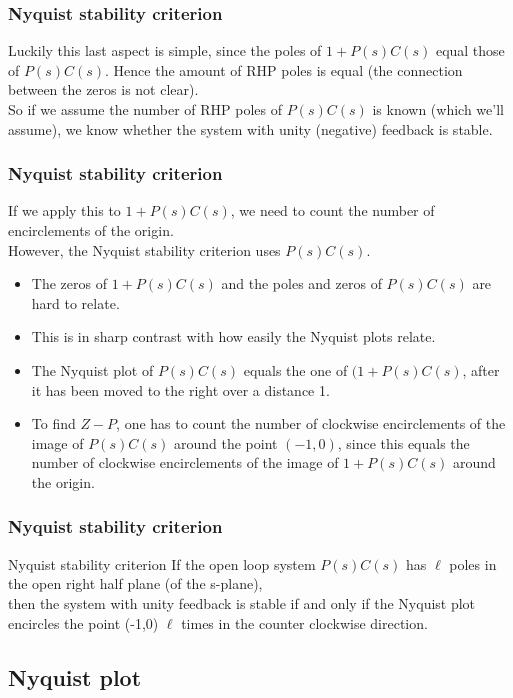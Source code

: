 \begin{frame}
	\frametitle{Nyquist stability criterion}
	\vspace{-10ex}
	Luckily this last aspect is simple, since the poles of $1+P(s)C(s)$ equal those of $P(s)C(s)$. Hence the amount of RHP poles is equal (the connection between the zeros is not clear).\\
	\bigskip
	So if we assume the number of RHP poles of $P(s)C(s)$ is known (which we'll assume), we know whether the system with unity (negative) feedback is stable.
\end{frame}

\begin{frame}
	\frametitle{Nyquist stability criterion}
	If we apply this to $1+P(s)C(s)$, we need to count the number of encirclements of the origin.\\
	However, the Nyquist stability criterion uses $P(s)C(s)$.
	\begin{itemize}
		\item The zeros of $1+P(s)C(s)$ and the poles and zeros of $P(s)C(s)$ are hard to relate.
		\item This is in sharp contrast with how easily the Nyquist plots relate.
		\item The Nyquist plot of $P(s)C(s)$ equals the one of $(1+P(s)C(s)$, after it has been moved to the right over a distance 1.
		\item To find $Z-P$, one has to count the number of clockwise encirclements of the image of $P(s)C(s)$ around the point $(-1,0)$, since this equals the number of clockwise encirclements of the image of $1+P(s)C(s)$ around the origin.
	\end{itemize}
\end{frame}

\begin{frame}
	\frametitle{Nyquist stability criterion}
	\begin{block}{Nyquist stability criterion}
		If the open loop system $P(s)C(s)$ has $\ell$ poles in the open right half plane (of the s-plane),\\
		then the system with unity feedback is stable if and only if the Nyquist plot encircles the point (-1,0) $\ell$ times in the counter clockwise direction.
		\end{block}
\end{frame}

\subsection{Nyquist plot}

